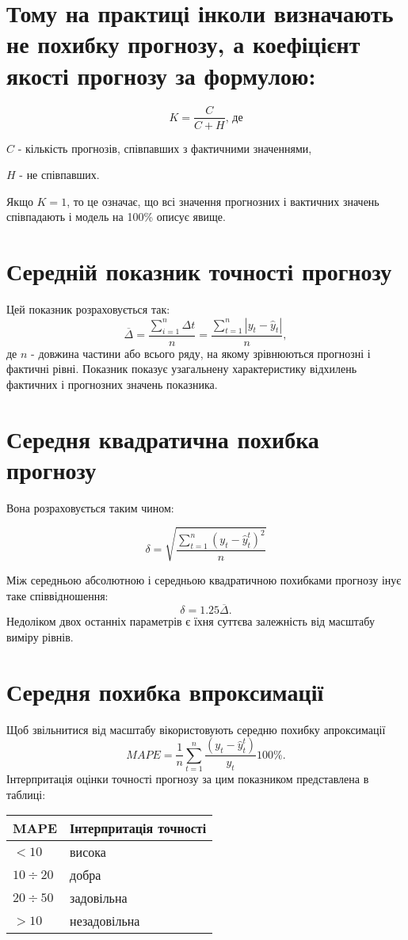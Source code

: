 \documentclass[a4paper, fontsize=10pt, oneside]{article}
\begin{document}
\section{\rm \normalsize Тому на практиці інколи визначають не похибку прогнозу, а коефіцієнт якості прогнозу за формулою:}
$$ K = \frac{C}{C + H}\texttt{, де}$$

$C$ - кількість прогнозів, співпавших з фактичними значеннями,

$H$ - не співпавших.

Якщо $K = 1$, то це означає, що всі значення прогнозних і вактичних значень співпадають і модель на 100\% описує явище.
\section{Середній показник точності прогнозу}
Цей показник розраховується так:
$$\overline{\Delta} = \frac{\sum \limits_{i = 1}^{n} \Delta t}{n} =  \frac{\sum \limits_{t = 1}^{n} |y_{t} - \hat{y}_{t}|}{n},$$
\noindent де $n$ - довжина частини або всього ряду, на якому зрівнюються прогнозні і фактичні рівні. Показник показує узагальнену характеристику відхилень фактичних і прогнозних значень показника.
\section{Середня квадратична похибка прогнозу}
Вона розраховується таким чином:

$$ \delta = \sqrt{\frac{\sum\limits_{t=1}^{n}(y_{t} - \hat{y}_{t}^{t})^2}{n}} $$

Між середньою абсолютною і середньою квадратичною похибками прогнозу інує таке співвідношення:
$$ \delta = 1.25 \overline{\Delta}.$$
Недоліком двох останніх параметрів є їхня суттєва залежність від масштабу виміру рівнів.
\section{Середня похибка впроксимації}
Щоб звільнитися від масштабу вікористовують середню похибку апроксимації
$$ MAPE = \frac{1}{n} \sum_{t=1}^{n} \frac{(y_{t} - \hat{y}_{t}^{t})}{y_{t}} 100\%.$$
Інтерпритація оцінки точності прогнозу за цим показником представлена в таблиці:

\begin{tabular}{|l|l|}
\hline
MAPE &Інтерпритація точності\\
\hline
$<10$ & висока\\
$10 \div 20$ & добра\\
$20 \div 50$ & задовільна\\
$>10$ & незадовільна\\
\hline
\end{tabular}
\end{document}
